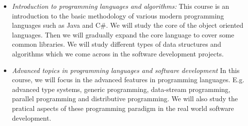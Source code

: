 \documentclass[12pt]{article}
\theoremstyle{plain} \numberwithin{equation}{section}
\theoremstyle{definition}
\begin{document}
{\begin{itemize}
 \item {\em Introduction to programming languages and algorithms:} 
This course is an introduction to the basic methodology of various modern programming 
languages such as Java and C\#. We will study the core of the object oriented 
languages. Then we will gradually expand the core language to cover 
some common libraries. We will study different types of data structures and algorithms
which we come across in the software development projects.
 \item {\em Advanced topics in programming languages and software development}
In this course, we will focus in the advanced features in programming languages.
E.g. advanced type systems, generic programming, data-stream programming,
parallel programming and distributive programming. We will also study 
the pratical aspects of these programming paradigm in the real world software development.
\end{itemize}
}
\end{document}
